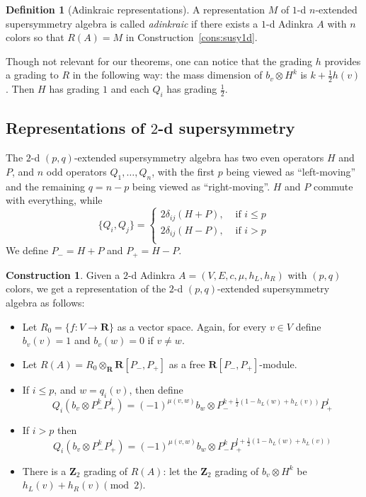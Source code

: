 \documentclass[12pt,twoside,singlespace]{article}
\numberwithin{equation}{section}
\theoremstyle{definition}
\newtheorem{definition}[equation]{Definition}
\newtheorem{construction}[equation]{Construction}
\newcommand{\ZZ}{\mathbf{Z}}
\newcommand{\RR}{\mathbf{R}}
\begin{document}
\begin{definition}[Adinkraic representations]
A representation $M$ of $1$-d $n$-extended supersymmetry algebra is called \emph{adinkraic} if there exists a $1$-d Adinkra $A$ with $n$ colors so that $R(A)=M$ in Construction~\ref{cons:susy1d}.
\end{definition}

Though not relevant for our theorems, one can notice that the grading $h$ provides a grading to $R$ in the following way: the mass dimension of $b_v\otimes H^k$ is $k+\frac12 h(v)$.  Then $H$ has grading $1$ and each $Q_i$ has grading $\frac12$.

\subsection{Representations of $2$-d supersymmetry}
The $2$-d $(p,q)$-extended supersymmetry algebra has two even operators $H$ and $P$, and $n$ odd operators $Q_1,\ldots, Q_n$, with the first $p$ being viewed as ``left-moving'' and the remaining $q=n-p$ being viewed as ``right-moving''.  $H$ and $P$ commute with everything, while
\[
\{Q_i, Q_j\}=\begin{cases}
2\delta_{ij}(H+ P),&\mbox{ if $i\le p$}\\
2\delta_{ij}(H- P),&\mbox{ if $i> p$}\\
\end{cases}
\]
We define $P_- = H+ P$ and $P_+=H-P$.

\begin{construction}
Given a $2$-d Adinkra $A=(V,E,c,\mu,h_L,h_R)$ with $(p,q)$ colors, we get a representation of the $2$-d $(p,q)$-extended supersymmetry algebra as follows:
\begin{itemize}
\item Let $R_0=\{f:V\to\RR\}$ as a vector space.  Again, for every $v\in V$ define $b_v(v)=1$ and $b_v(w)=0$ if $v\not=w$.
\item Let $R(A)=R_0\otimes_\RR \RR[P_-,P_+]$ as a free $\RR[P_-,P_+]$-module.
\item If $i\le p$, and $w=q_i(v)$, then define
\[Q_i(b_v\otimes P_-^k P_+^l)=
(-1)^{\mu(v,w)}b_w\otimes P_-^{k+\frac12(1-h_L(w)+h_L(v))}P_+^l \]
\item If $i>p$ then
\[Q_i(b_v\otimes P_-^k P_+^l)=
(-1)^{\mu(v,w)}b_w\otimes P_-^k P_+^{l+\frac12(1-h_L(w)+h_L(v))} \]
\item There is a $\ZZ_2$ grading of $R(A)$: let the $\ZZ_2$ grading of $b_v\otimes H^k$ be $h_L(v)+h_R(v)\pmod{2}$.
\end{itemize}
\end{construction}
\end{document}
